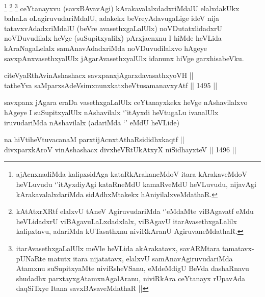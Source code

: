 \begin{artha}
\footnote{ajAcnxnadiMda kalipxsidAga kataRkArakaneMdoV itara kArakaveMdoV heVLuvudu `\stext'itAyxdiyAgi kataRneMdU kamaRveMdU heVLuvudu, nijavAgi kArakavalalxdariMda sidAdhxMtakekx hAniyilalxveMdathaR.}
\footnote{kAtAtxrXRtf elalxvU tAneV AgiruvudariMda `\stext'eMdaMte viBAgavatf eMdu heVLidadxrU viBAgavuLaLxdadxlalx, viBAgavU itarAvasethxgaLalilx kalipxtavu, adariMda kUTasathxnu niviRkAranU AgiruvaneMdathaR.}
\footnote{itarAvasethxgaLalUlx meVle heVLida akArakatavx, savARMtara tamatavx- pUNaRte matutx itara nijatatavx, elalxvU samAnavAgiruvudariMda Atamxnu suSupitxyaMte niviRsheVSanu, eMdeMdigU BeVda dashaRnavu shudadhx parxtayxgAtamxnAgalAranu, niviRkAra ceYtanayx rUpavAda daqSiTxye Itana savxBAvaveMdathaR ||}
ceYtanayxvu (savxBAvavAgi) kArakavalalxdadxriMdalU elalxdakUkx bahaLa oLagiruvudariMdalU, adakekx beVreyAdavugaLige ideV nija tatavxvAdadxriMdalU (beVre avasethxgaLalUlx) noVDutatxlidadxrU noVDuvudilalx heVge (suSupitxyalilx) pArxjacnxnu I hiMde heVLida kAraNagaLelalx samAnavAdadxriMda noVDuvudilalxvo hAgeye savxpAnxvasethxyalUlx jAgarAvasethxyalUlx idanunx hiVge garxhisabeVku.
\end{artha}



\begin{shl}
citeVyaRthA\s vinAshashacx savxpanxjAgarxdavasathxyoVH || \\
tatheYva saMparxsAdeV\s simxnunxkatxheVtusamanavxyAtf ||  1495 ||  
\end{shl}

\begin{artha}
savxpanx jAgara eraDa vasethxgaLalUlx ceYtanayxkekx heVge nAshavilalxvo hAgeye I suSupitxyalUlx nAshavilalx `\stext'itAyxdi heVtugaLu ivanalUlx iruvudariMda nAshavilalx (adariMda `\stext' eMdU heVLide)
\end{artha}



\begin{shl}
na hiVtiheVtuvacanaM parxtijAcnxtAthaRsididhxkaqtf || \\
divxparxkAroV vinAshashacx divxheVRtUkAtxyX niSidhayxteV ||  1496 ||  
\end{shl}

